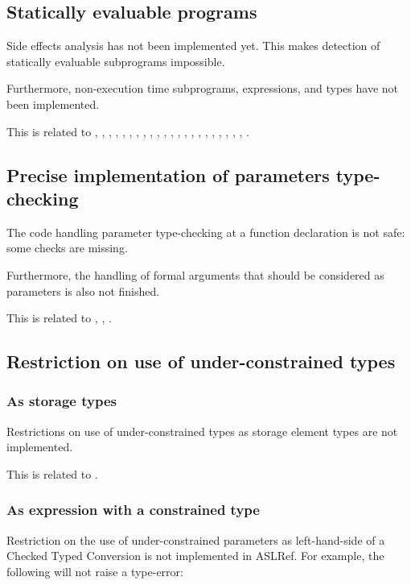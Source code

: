 \documentclass{book}
\begin{document}
\subsection{Statically evaluable programs}%
\label{sec:nyi:statically-evaluable-subprograms}

Side effects analysis has not been implemented yet.
%
This makes detection of statically evaluable subprograms impossible.

Furthermore, non-execution time subprograms, expressions, and types have not
been implemented.

This is related to , , , ,
, , , , ,
, , , , ,
, , , , ,
, , , .

\subsection{Precise implementation of parameters type-checking}

The code handling parameter type-checking at a function declaration is not
safe: some checks are missing.

Furthermore, the handling of formal arguments that should be considered as
parameters is also not finished.

This is related to , , .

\subsection{Restriction on use of under-constrained types}

\subsubsection{As storage types}
Restrictions on use of under-constrained types as storage element types are not
implemented.

This is related to .

\subsubsection{As expression with a constrained type}

Restriction on the use of under-constrained parameters as left-hand-side of a
Checked Typed Conversion is not implemented in ASLRef.
%
For example, the following will not raise a type-error:
\end{document}
